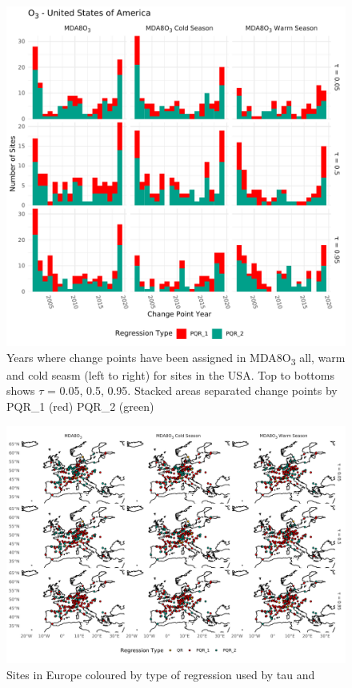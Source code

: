 \documentclass{article}
\begin{document}
\begin{figure}[p]
\centering
\includegraphics[width=\linewidth]{figures/si_figures/fS02_cp_year_o3_United-States-of-America.pdf}
\caption{Years where change points have been assigned in MDA8O\textsubscript{3} all, warm and cold seasm (left to right) for sites in the USA. Top to bottoms shows $\tau$ = 0.05, 0.5, 0.95. Stacked areas separated change points by PQR\_1 (red) PQR\_2 (green)}
\label{si_fig:cp_year_usa}
\end{figure}
\clearpage

\begin{figure}
\centering
\includegraphics[width=\linewidth]{figures/si_figures/fS03_regression_type_map_eu.pdf}
\caption{Sites in Europe coloured by type of regression used by tau and }
\label{si_fig:reg_map}
\end{figure}
\clearpage
\end{document}
